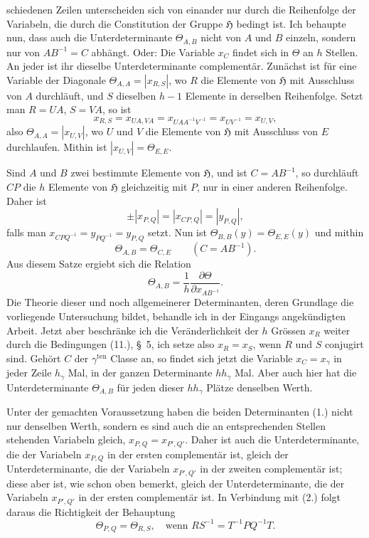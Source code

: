 \documentclass[11pt]{article}
\newcommand{\grp}{\mathfrak{H}}
\begin{document}
schiedenen Zeilen unterscheiden sich von einander nur durch die Reihenfolge der Variabeln, die durch die Constitution der Gruppe $\grp$ bedingt ist. Ich behaupte nun, dass auch die Unterdeterminante $\Theta_{A,B}$ nicht von $A$ und $B$ einzeln, sondern nur von $AB^{-1}=C$ abhängt. Oder: Die Variable $x_C$ findet sich in $\Theta$ an $h$ Stellen. An jeder ist ihr dieselbe Unterdeterminante complementär. Zunächst ist für eine Variable der Diagonale $\Theta_{A,A}=\left|x_{R,S}\right|$, wo $R$ die Elemente von $\grp$ mit Ausschluss von $A$ durchläuft, und $S$ dieselben $h-1$ Elemente in derselben Reihenfolge. Setzt man $R=UA$, $S=VA$, so ist
\[
x_{R,S}=x_{UA,VA}=x_{UAA^{-1}V^{-1}}=x_{UV^{-1}}=x_{U,V},
\]
also $\Theta_{A,A}=\left|x_{U,V}\right|$, wo $U$ und $V$ die Elemente von $\grp$ mit Ausschluss von $E$ durchlaufen. Mithin ist $\left|x_{U,V}\right|=\Theta_{E,E}$.

Sind $A$ und $B$ zwei bestimmte Elemente von $\grp$, und ist $C=AB^{-1}$, so durchläuft $CP$ die $h$ Elemente von $\grp$ gleichzeitig mit $P$, nur in einer anderen Reihenfolge. Daher ist
\[
\pm\left|x_{P,Q}\right|=\left|x_{CP,Q}\right|=\left|y_{P,Q}\right|,
\]
falls man $x_{CPQ^{-1}}=y_{PQ^{-1}}=y_{P,Q}$ setzt. Nun ist $\Theta_{B,B}(y)=\Theta_{E,E}(y)$ und mithin
\begin{equation*}\tag{2.}
\Theta_{A,B}=\Theta_{C,E}\qquad(C=AB^{-1}).
\end{equation*}
Aus diesem Satze ergiebt sich die Relation
\begin{equation*}\tag{3.}
\Theta_{A,B}=\frac{1}{h}\frac{\partial\Theta}{\partial x_{AB^{-1}}}.
\end{equation*}
Die Theorie dieser und noch allgemeinerer Determinanten, deren Grundlage die vorliegende Untersuchung bildet, behandle ich in der Eingangs angekündigten Arbeit. Jetzt aber beschränke ich die Veränderlichkeit der $h$ Grössen $x_R$ weiter durch die Bedingungen (11.), \S~5, ich setze also $x_R=x_S$, wenn $R$ und $S$ conjugirt sind. Gehört $C$ der $\gamma^{\text{ten}}$ Classe an, so findet sich jetzt die Variable $x_C=x_\gamma$ in jeder Zeile $h_\gamma$ Mal, in der ganzen Determinante $h h_\gamma$ Mal. Aber auch hier hat die Unterdeterminante $\Theta_{A,B}$ für jeden dieser $h h_\gamma$ Plätze denselben Werth.

Unter der gemachten Voraussetzung haben die beiden Determinanten (1.) nicht nur denselben Werth, sondern es sind auch die an entsprechenden Stellen stehenden Variabeln gleich, $x_{P,Q}=x_{P',Q'}$. Daher ist auch die Unterdeterminante, die der Variabeln $x_{P,Q}$ in der ersten complementär ist, gleich der Unterdeterminante, die der Variabeln $x_{P',Q'}$ in der zweiten complementär ist; diese aber ist, wie schon oben bemerkt, gleich der Unterdeterminante, die der Variabeln $x_{P',Q'}$ in der ersten complementär ist. In Verbindung mit (2.) folgt daraus die Richtigkeit der Behauptung
\begin{equation*}\tag{4.}
\Theta_{P,Q}=\Theta_{R,S},\quad \text{wenn } RS^{-1}=T^{-1}PQ^{-1}T.
\end{equation*}
\end{document}
